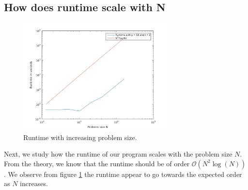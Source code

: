 \subsection*{How does runtime scale with N}
\begin{figure}[h!]
			\centering
			\includegraphics[width=0.7\textwidth]{./figures/runtimeN}
			\caption{Runtime with increasing problem size.}
			\label{fig:runtimeN}
\end{figure}
Next, we study how the runtime of our program scales with the problem size $N$. From the theory, we know that the runtime should be of order $\mathcal{O}(N^2\log(N))$. We observe from figure \ref{fig:runtimeN} the runtime appear to go towards the expected order as $N$ increases. 
